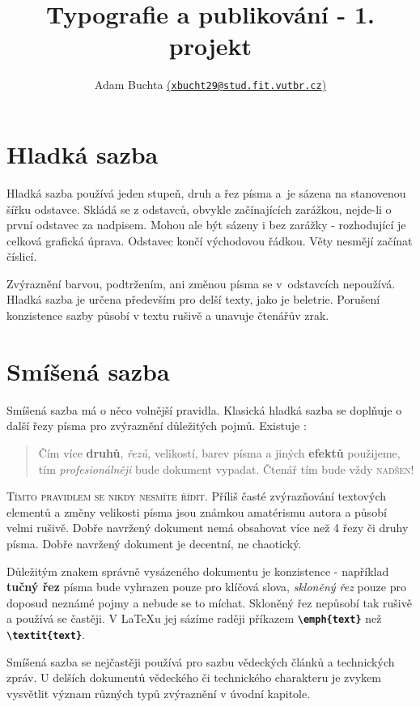 \documentclass[a4paper,10pt,twocolumn]{article}
\title{Typografie a publikování - 1. projekt}
\author{Adam Buchta \href{mailto:xbucht29@stud.fit.vutbr.cz}{(\texttt{xbucht29@stud.fit.vutbr.cz})}}
\date{}
\begin{document}
\maketitle
\section{Hladká sazba}
Hladká sazba používá jeden stupeň, druh a řez písma a~je sázena na stanovenou šířku odstavce. Skládá se z odstavců, obvykle začínajících zarážkou, nejde-li o první odstavec za nadpisem. Mohou ale být sázeny i bez zarážky - rozhodující je celková grafická úprava. Odstavec končí východovou řádkou. Věty nesmějí začínat číslicí.

Zvýraznění barvou, podtržením, ani změnou písma se v~odstavcích nepoužívá. Hladká sazba je určena především pro delší texty, jako je beletrie. Porušení konzistence sazby působí v textu rušivě a unavuje čtenářův zrak.
\section{Smíšená sazba}
Smíšená sazba má o něco volnější pravidla. Klasická hladká sazba se doplňuje o další řezy písma pro zvýraznění důležitých pojmů. Existuje :
\begin{quotation}
{\large Čím} více {\large \textbf{druhů}}, \emph{řezů,} {\small velikostí,} barev písma \textsf{a jiných {\tiny\textbf{efektů}}} použijeme, tím \emph{profesionálněji} bude dokument vypadat. Čtenář tím {\large bude} {\Large vždy} \textsc {\Huge nadšen!}
\end{quotation}
\textsc{Tímto pravidlem se nikdy nesmíte řídit.} Příliš časté zvýrazňování textových elementů a změny velikosti písma jsou známkou amatérismu autora a působí velmi rušivě. Dobře navržený dokument nemá obsahovat více než
4 řezy či druhy písma. Dobře navržený dokument je decentní, ne chaotický.

Důležitým znakem správně vysázeného dokumentu je konzistence - například \textbf{tučný řez} písma bude vyhrazen pouze pro klíčová slova, \emph{skloněný řez} pouze pro doposud neznámé pojmy a nebude se to míchat. Skloněný řez nepůsobí tak rušivě a používá se častěji. V \LaTeX u jej sázíme raději příkazem \textbf{\texttt{\textbackslash emph\{text\}}} než \textbf{\texttt{\textbackslash textit\{text\}}}.

Smíšená sazba se nejčastěji používá pro sazbu vědeckých článků a technických zpráv. U delších dokumentů vědeckého či technického charakteru je zvykem vysvětlit význam různých typů zvýraznění v úvodní kapitole.
\end{document}
